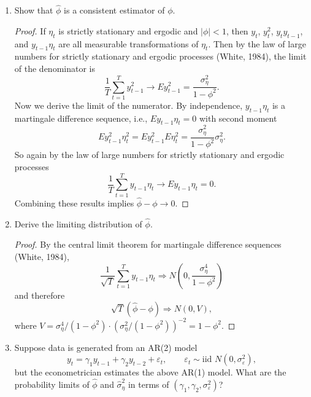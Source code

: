 \documentclass[oneside,reqno]{amsart}
\newcommand{\eps}{\varepsilon}
\theoremstyle{definition}
\begin{document}
\begin{enumerate}
\item
Show that $\hat \phi$ is a consistent estimator of $\phi$.

\begin{proof}
If $\eta_t$ is strictly stationary and ergodic and $|\phi| <1$, then $y_t$, $y_t^2$, $y_ty_{t-1}$, and $y_{t-1} \eta_t$ are all measurable transformations of $\eta_t$. Then by the law of large numbers for strictly stationary and ergodic processes (White, 1984), the limit of the denominator is
\[
	\frac{1}{T}\sum_{t=1}^T y_{t-1}^2 \to E y_{t-1}^2 = \frac{\sigma_\eta^2}{1-\phi^2}.
\] 
Now we derive the limit of the numerator. By independence, $y_{t-1} \eta_t$ is a martingale difference sequence, i.e., $E y_{t-1} \eta_t = 0$ with second moment
\[
	E y_{t-1}^2\eta_t^2 =E y_{t-1}^2 E \eta_t^2 =\frac{\sigma_\eta^2}{1-\phi^2} \sigma_\eta^2.
\]
So again by the law of large numbers for strictly stationary and ergodic processes 
\[
	\frac{1}{T}\sum_{t=1}^T y_{t-1}\eta_t \to E y_{t-1}\eta_t = 0.
\]
Combining these results implies $\hat \phi - \phi \to 0$.
\end{proof}

\item
Derive the limiting distribution of $\hat\phi$.

\begin{proof}
By the central limit theorem for martingale difference sequences (White, 1984), 
\[
	\frac{1}{\sqrt T} \sum_{t=1}^T y_{t-1}\eta_t \Rightarrow N\left(0, \frac{\sigma_\eta^4}{1-\phi^2} \right)
\]
and therefore
\[
	\sqrt T(\hat \phi - \phi) \Rightarrow N(0, V),
\]
where $V = \sigma_\eta^4/(1-\phi^2) \cdot (\sigma_\eta^{2}/(1-\phi^2))^{-2} = 1-\phi^2$.
\end{proof}

\item
Suppose data is generated from an AR(2) model 
\begin{equation}\label{eq:4}
	y_t = \gamma_1 y_{t-1} + \gamma_2 y_{t-2} + \eps_t, \qquad \eps_t \sim \text{iid }N(0, \sigma_\eps^2),
\end{equation}
but the econometrician estimates the above AR(1) model. What are the probability limits of $\hat \phi$ and $\hat\sigma_\eta^2$ in terms of $(\gamma_1, \gamma_2, \sigma_\eps^2)$?


\end{enumerate}
\end{document}
